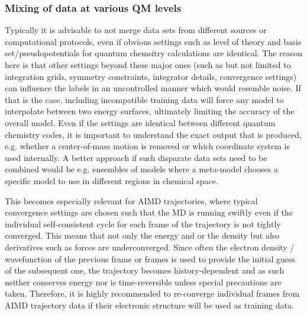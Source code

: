 \documentclass[9pt,bestpractices]{livecoms}
\begin{document}
\subsubsection{Mixing of data at various QM levels}
Typically it is advisable to not merge data sets from different sources or computational protocols, even if obvious settings such as level of theory and basis set/pseudopotentials for quantum chemsitry calculations are identical. The reason here is that other settings beyond these major ones (such as but not limited to integration grids, symmetry constraints, integrator details, convergence settings) can influence the labels in an uncontrolled manner which would resemble noise. If that is the case, including incompatible training data will force any model to interpolate between two energy surfaces, ultimately limiting the accuracy of the overall model. Even if the settings are identical between different quantum chemistry codes, it is important to understand the exact output that is produced, e.g. whether a center-of-mass motion is removed or which coordinate system is used internally. A better approach if such disparate data sets need to be combined would be e.g. ensembles of models where a meta-model chooses a specific model to use in different regions in chemical space.

This becomes especially relevant for AIMD trajectories, where typical convergence settings are chosen such that the MD is running swiftly even if the individual self-consistent cycle for each frame of the trajectory is not tightly converged. This means that not only the energy and or the density but also derivatives such as forces are underconverged. Since often the electron density / wavefunction of the previous frame or frames is used to provide the initial guess of the subsequent one, the trajectory becomes history-dependent and as such neither conserves energy nor is time-reversible unless special precautions are taken. Therefore, it is highly recommended to re-converge individual frames from AIMD trajectory data if their electronic structure will be used as training data.
\end{document}
